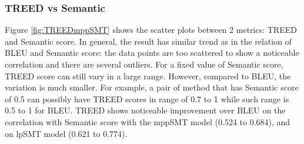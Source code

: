 \subsubsection{\textbf{TREED vs Semantic}}


Figure \ref{fig:TREEDmppSMT} shows the scatter plots between 2
metrics: TREED and Semantic score. In general, the result has similar
trend as in the relation of BLEU and Semantic score: the data points
are too scattered to show a noticeable correlation and there are
several outliers. For a fixed value of Semantic score, TREED score can
still vary in a large range. However, compared to BLEU, the variation
is much smaller. For example, a pair of method that has Semantic score
of 0.5 can possibly have TREED scores in range of 0.7 to 1 while such
range is 0.5 to 1 for BLEU. TREED shows noticeable improvement over
BLEU on the correlation with Semantic score with the mppSMT model
(0.524 to 0.684), and on lpSMT model (0.621 to 0.774).

%




